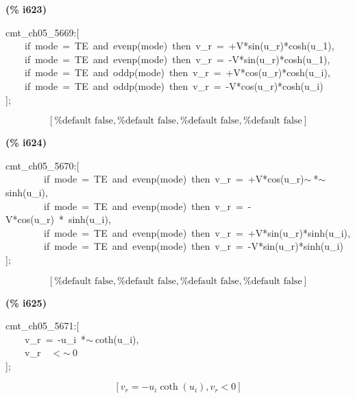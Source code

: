 \documentclass[fleqn]{article}
\begin{document}
\noindent
\begin{minipage}[t]{4.000000em}\color{red}\bfseries
(\% i623)	
\end{minipage}
\begin{minipage}[t]{\textwidth}\color{blue}
cmt\_ch05\_5669:[\\
\ \ \ \ if\ mode\ =\ TE\ and\ evenp(mode)\ then\ v\_r\ =\ +V*sin(u\_r)*cosh(u\_1),\\
\ \ \ \ if\ mode\ =\ TE\ and\ evenp(mode)\ then\ v\_r\ =\ -V*sin(u\_r)*cosh(u\_1),\\
\ \ \ \ if\ mode\ =\ TE\ and\ oddp(mode)\ then\ v\_r\ =\ +V*cos(u\_r)*cosh(u\_i),\\
\ \ \ \ if\ mode\ =\ TE\ and\ oddp(mode)\ then\ v\_r\ =\ -V*cos(u\_r)*cosh(u\_i)\ \ \\
];
\end{minipage}
\[\displaystyle \tag{\% o623} 
\left[ \mbox{%
false}\operatorname{,}\mbox{%
false}\operatorname{,}\mbox{%
false}\operatorname{,}\mbox{%
false}\right] \mbox{}
\]


\noindent
\begin{minipage}[t]{4.000000em}\color{red}\bfseries
(\% i624)	
\end{minipage}
\begin{minipage}[t]{\textwidth}\color{blue}
cmt\_ch05\_5670:[\\
\ \ \ \ \ \ \ \ if\ mode\ =\ TE\ and\ evenp(mode)\ then\ v\_r\ =\ +V*cos(u\_r)\ensuremath{\sim\ }*\ensuremath{\sim\ }sinh(u\_i),\\
\ \ \ \ \ \ \ \ if\ mode\ =\ TE\ and\ evenp(mode)\ then\ v\_r\ =\ -V*cos(u\_r)\ *\ sinh(u\_i),\\
\ \ \ \ \ \ \ \ if\ mode\ =\ TE\ and\ evenp(mode)\ then\ v\_r\ =\ +V*sin(u\_r)*sinh(u\_i),\\
\ \ \ \ \ \ \ \ if\ mode\ =\ TE\ and\ evenp(mode)\ then\ v\_r\ =\ -V*sin(u\_r)*sinh(u\_i)\\
];
\end{minipage}
\[\displaystyle \tag{\% o624} 
\left[ \mbox{%
false}\operatorname{,}\mbox{%
false}\operatorname{,}\mbox{%
false}\operatorname{,}\mbox{%
false}\right] \mbox{}
\]


\noindent
\begin{minipage}[t]{4.000000em}\color{red}\bfseries
(\% i625)	
\end{minipage}
\begin{minipage}[t]{\textwidth}\color{blue}
cmt\_ch05\_5671:[\\
\ \ \ \ v\_r\ =\ -u\_i\ *\ensuremath{\sim\ }coth(u\_i),\\
\ \ \ \ v\_r\ \ \ensuremath{<}\ensuremath{\sim\ }0\\
];
\end{minipage}
\[\displaystyle \tag{\% o625} 
\left[ {v_r}=-{u_i} \operatorname{coth}\left( {u_i}\right) \operatorname{,}{v_r}\operatorname{<  }0\right] \mbox{}
\]
\end{document}
